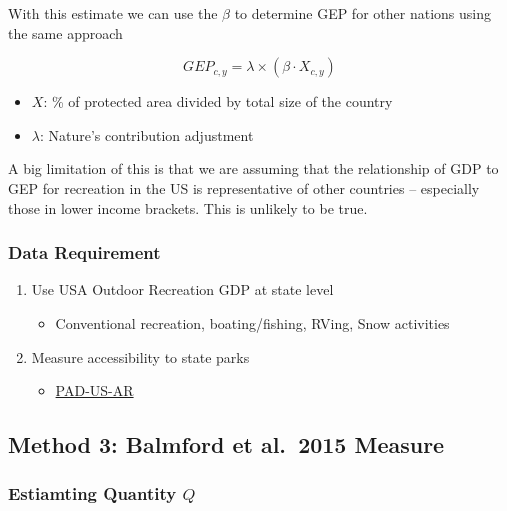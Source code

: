 \documentclass[
  letterpaper,
  DIV=11,
  numbers=noendperiod]{scrartcl}
\providecommand{\tightlist}{%
  \setlength{\itemsep}{0pt}\setlength{\parskip}{0pt}}\usepackage{longtable,booktabs,array}
\begin{document}
With this estimate we can use the \(\beta\) to determine GEP for other
nations using the same approach

\[
GEP_{c,y} = \lambda \times (\beta \cdot X_{c,y})
\]

\begin{itemize}
\tightlist
\item
  \(X\): \% of protected area divided by total size of the country
\item
  \(\lambda\): Nature's contribution adjustment
\end{itemize}

A big limitation of this is that we are assuming that the relationship
of GDP to GEP for recreation in the US is representative of other
countries -- especially those in lower income brackets. This is unlikely
to be true.

\hypertarget{data-requirement}{%
\subsubsection{Data Requirement}\label{data-requirement}}

\begin{enumerate}
\def\labelenumi{\arabic{enumi}.}
\tightlist
\item
  Use USA Outdoor Recreation GDP at state level

  \begin{itemize}
  \tightlist
  \item
    Conventional recreation, boating/fishing, RVing, Snow activities
  \end{itemize}
\item
  Measure accessibility to state parks

  \begin{itemize}
  \tightlist
  \item
    \href{https://www.nature.com/articles/s41597-022-01857-7}{PAD-US-AR}
  \end{itemize}
\end{enumerate}

\hypertarget{method-3-balmford-et-al.-2015-measure}{%
\subsection{Method 3: Balmford et al.~2015
Measure}\label{method-3-balmford-et-al.-2015-measure}}

\hypertarget{estiamting-quantity-q}{%
\subsubsection{\texorpdfstring{Estiamting Quantity
\(Q\)}{Estiamting Quantity Q}}\label{estiamting-quantity-q}}
\end{document}
